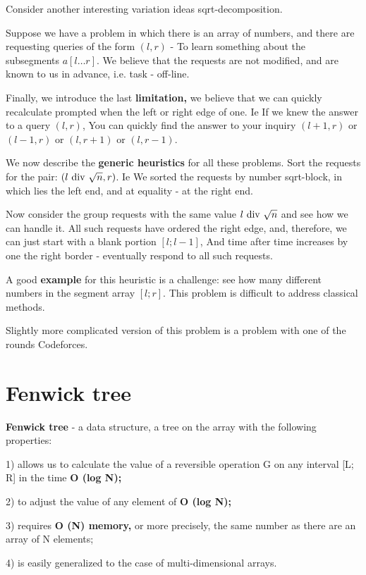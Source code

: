 Consider another interesting variation ideas sqrt-decomposition.

Suppose we have a problem in which there is an array of numbers, and there are requesting queries of the form $(l, r)$ - To learn something about the subsegments $a [l \ldots r]$. We believe that the requests are not modified, and are known to us in advance, i.e. task - off-line.

Finally, we introduce the last \textbf{limitation,} we believe that we can quickly recalculate prompted when the left or right edge of one. Ie If we knew the answer to a query $(l, r)$, You can quickly find the answer to your inquiry $(l +1, r)$ or $(l-1, r)$ or $(l, r +1)$ or $(l, r-1)$.

We now describe the \textbf{generic heuristics} for all these problems. Sort the requests for the pair: $(l ~ {\rm div} ~ \sqrt {n}, r)$. Ie We sorted the requests by number sqrt-block, in which lies the left end, and at equality - at the right end.

Now consider the group requests with the same value $l ~ {\rm div} ~ \sqrt {n}$ and see how we can handle it. All such requests have ordered the right edge, and, therefore, we can just start with a blank portion $[l; l-1]$, And time after time increases by one the right border - eventually respond to all such requests.

A good \textbf{example} for this heuristic is a challenge: see how many different numbers in the segment array $[l; r]$. This problem is difficult to address classical methods.

Slightly more complicated version of this problem is a problem with one of the rounds Codeforces.


\section{ Fenwick tree }
\textbf{Fenwick tree} - a data structure, a tree on the array with the following properties:

1) allows us to calculate the value of a reversible operation G on any interval [L; R] in the time \textbf{O (log N);}

2) to adjust the value of any element of \textbf{O (log N);}

3) requires \textbf{O (N) memory,} or more precisely, the same number as there are an array of N elements;

4) is easily generalized to the case of multi-dimensional arrays.

